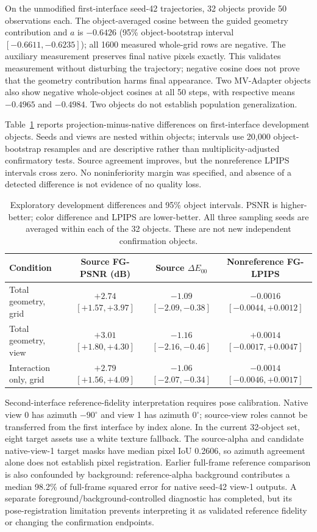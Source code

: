 \documentclass[11pt]{article}
\begin{document}
On the unmodified first-interface seed-42 trajectories, 32 objects provide
50 observations each. The object-averaged cosine between the guided geometry
contribution and $a$ is $-0.6426$ (95\% object-bootstrap interval
$[-0.6611,-0.6235]$); all 1600 measured whole-grid rows are negative.
The auxiliary measurement preserves final native pixels exactly. This validates
measurement without disturbing the trajectory; negative cosine does not prove
that the geometry contribution harms final appearance. Two MV-Adapter objects
also show negative whole-object cosines at all 50 steps, with respective means
$-0.4965$ and $-0.4984$. Two objects do not establish population generalization.

Table~\ref{tab:development012} reports projection-minus-native differences on
first-interface development objects. Seeds and views are nested within objects;
intervals use 20,000 object-bootstrap resamples and are descriptive rather than
multiplicity-adjusted confirmatory tests. Source agreement improves, but the
nonreference LPIPS intervals cross zero. No noninferiority margin was specified,
and absence of a detected difference is not evidence of no quality loss.

\begin{table}[ht]
\centering\scriptsize
\begin{tabular}{lccc}
\toprule
Condition & Source FG-PSNR (dB) & Source $\Delta E_{00}$ & Nonreference FG-LPIPS \\
\midrule
Total geometry, grid & $+2.74$ $[+1.57,+3.97]$ & $-1.09$ $[-2.09,-0.38]$ & $-0.0016$ $[-0.0044,+0.0012]$ \\
Total geometry, view & $+3.01$ $[+1.80,+4.30]$ & $-1.16$ $[-2.16,-0.46]$ & $+0.0014$ $[-0.0017,+0.0047]$ \\
Interaction only, grid & $+2.79$ $[+1.56,+4.09]$ & $-1.06$ $[-2.07,-0.34]$ & $-0.0014$ $[-0.0046,+0.0017]$ \\
\bottomrule
\end{tabular}
\caption{Exploratory development differences and 95\% object intervals.
PSNR is higher-better; color difference and LPIPS are lower-better. All three
sampling seeds are averaged within each of the 32 objects. These are not new
independent confirmation objects.}
\label{tab:development012}
\end{table}

Second-interface reference-fidelity interpretation requires pose calibration. Native
view 0 has azimuth $-90^\circ$ and view 1 has azimuth $0^\circ$; source-view roles
cannot be transferred from the first interface by index alone. In the current
32-object set, eight target assets use a white texture fallback. The source-alpha
and candidate native-view-1 target masks have median pixel IoU 0.2606, so azimuth
agreement alone does not establish pixel registration. Earlier full-frame
reference comparison is also confounded by background: reference-alpha
background contributes a median 98.2\% of full-frame squared error for native
seed-42 view-1 outputs. A separate foreground/background-controlled diagnostic
has completed, but its pose-registration limitation prevents interpreting it as
validated reference fidelity or changing the confirmation endpoints.
\end{document}
